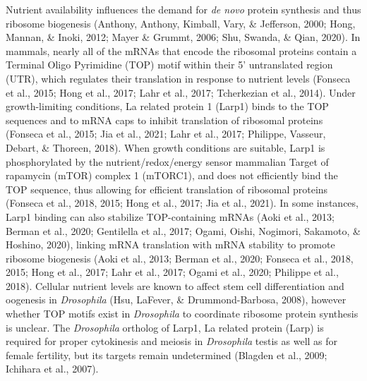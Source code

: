 \documentclass[12pt,oneside]{reedthesis}
\begin{document}
Nutrient availability influences the demand for \emph{de novo} protein
synthesis and thus ribosome biogenesis
(Anthony, Anthony, Kimball, Vary, \& Jefferson, 2000; Hong, Mannan, \& Inoki, 2012; Mayer \& Grummt, 2006; Shu, Swanda, \& Qian, 2020). In mammals, nearly all of the mRNAs that
encode the ribosomal proteins contain a Terminal Oligo Pyrimidine (TOP)
motif within their 5' untranslated region (UTR), which regulates their
translation in response to nutrient levels (Fonseca et al., 2015; Hong et al., 2017; Lahr et al., 2017; Tcherkezian et al., 2014). Under growth-limiting
conditions, La related protein 1 (Larp1) binds to the TOP sequences and
to mRNA caps to inhibit translation of ribosomal proteins
(Fonseca et al., 2015; Jia et al., 2021; Lahr et al., 2017; Philippe, Vasseur, Debart, \& Thoreen, 2018). When growth conditions are
suitable, Larp1 is phosphorylated by the nutrient/redox/energy sensor
mammalian Target of rapamycin (mTOR) complex 1 (mTORC1), and does not
efficiently bind the TOP sequence, thus allowing for efficient
translation of ribosomal proteins (Fonseca et al., 2018, 2015; Hong et al., 2017; Jia et al., 2021). In some instances, Larp1 binding can also
stabilize TOP-containing mRNAs (Aoki et al., 2013; Berman et al., 2020; Gentilella et al., 2017; Ogami, Oishi, Nogimori, Sakamoto, \& Hoshino, 2020), linking mRNA translation
with mRNA stability to promote ribosome biogenesis
(Aoki et al., 2013; Berman et al., 2020; Fonseca et al., 2018, 2015; Hong et al., 2017; Lahr et al., 2017; Ogami et al., 2020; Philippe et al., 2018). Cellular nutrient levels are
known to affect stem cell differentiation and oogenesis in \emph{Drosophila}
(Hsu, LaFever, \& Drummond-Barbosa, 2008), however whether TOP motifs exist in
\emph{Drosophila} to coordinate ribosome protein synthesis is unclear. The
\emph{Drosophila} ortholog of Larp1, La related protein (Larp) is required
for proper cytokinesis and meiosis in \emph{Drosophila} testis as well as for
female fertility, but its targets remain undetermined (Blagden et al., 2009; Ichihara et al., 2007).
\end{document}
